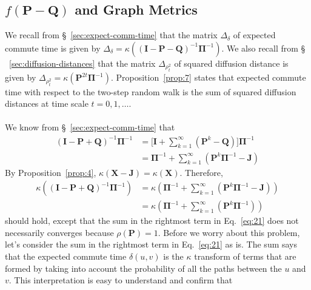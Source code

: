 \documentclass[10pt,twocolumn]{article}
\numberwithin{equation}{section}
\begin{document}
\subsection{$f(\mathbf{P} - \mathbf{Q})$ and Graph Metrics}
\label{general_graph_metrics}
We recall from \S ~\ref{sec:expect-comm-time} that the matrix
$\Delta_{\delta}$ of expected commute time is given by
$\Delta_{\delta} = \kappa((\mathbf{I} - \mathbf{P} -
\mathbf{Q})^{-1}\bm{\Pi}^{-1})$. We also recall from \S
~\ref{sec:diffusion-distances} that the matrix $\Delta_{\rho_{t}^{2}}$
of squared diffusion distance is given by $\Delta_{\rho_{t}^{2}} =
\kappa(\mathbf{P}^{2t}\bm{\Pi}^{-1})$. Proposition~\ref{prop:7}
states that expected commute time with respect to the two-step random
walk is the sum of squared diffusion distances at time scale
$t=0,1,\dots$. \\
\\
\noindent
We know from \S~\ref{sec:expect-comm-time} that
\begin{equation}
  \label{eq:20}
  \begin{split}
    (\mathbf{I} - \mathbf{P} + \mathbf{Q})^{-1}\bm{\Pi}^{-1} &=
    \biggl[\mathbf{I} + \sum_{k=1}^{\infty}{(\mathbf{P}^{k} -
      \mathbf{Q})}\biggr]\bm{\Pi}^{-1} \\
    & = \bm{\Pi}^{-1} +
    \sum_{k=1}^{\infty}{(\mathbf{P}^{k}\bm{\Pi}^{-1} - \mathbf{J})}
  \end{split}
\end{equation}
By Proposition~\ref{prop:4}, $\kappa(\mathbf{X} -
\mathbf{J}) = \kappa(\mathbf{X})$. Therefore,
\begin{equation}
  \label{eq:21}
  \begin{split}
    \kappa((\mathbf{I} - \mathbf{P} + \mathbf{Q})^{-1}\bm{\Pi}^{-1})
    &= \kappa(\bm{\Pi}^{-1} +
    \sum_{k=1}^{\infty}{(\mathbf{P}^{k}\bm{\Pi}^{-1} - \mathbf{J})}) \\
    &= \kappa(\bm{\Pi}^{-1} +
    \sum_{k=1}^{\infty}{(\mathbf{P}^{k}\bm{\Pi}^{-1})})
  \end{split}
\end{equation}
should hold, except that the sum in the rightmost term in
Eq.~\eqref{eq:21} does not necessarily converges because 
$\rho(\mathbf{P}) = 1$. Before we worry about this problem, let's
consider the sum in the rightmost term in Eq.~\eqref{eq:21} as is. The sum
says that the expected commute time $\delta(u,v)$ is the
$\kappa$ transform of terms that are formed by taking into account the
probability of all the paths between the $u$ and $v$. This
interpretation is easy to understand and confirm that
\end{document}
